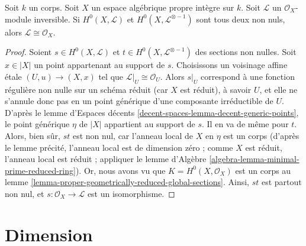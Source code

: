 \begin{lemma}
\label{lemma-characterize-trivial-pic-integral}
Soit $k$ un corps. Soit $X$ un espace algébrique propre intègre sur $k$.
Soit $\mathcal{L}$ un $\mathcal{O}_X$-module inversible.
Si $H^0(X, \mathcal{L})$ et $H^0(X, \mathcal{L}^{\otimes - 1})$
sont tous deux non nuls, alors $\mathcal{L} \cong \mathcal{O}_X$.
\end{lemma}

\begin{proof}
Soient $s \in H^0(X, \mathcal{L})$ et $t \in H^0(X, \mathcal{L}^{\otimes - 1})$
des sections non nulles. Soit $x \in |X|$ un point appartenant au support de $s$.
Choisissons un voisinage affine \'etale $(U, u) \to (X, x)$ tel que
$\mathcal{L}|_U \cong \mathcal{O}_U$. Alors $s|_U$ correspond à une fonction régulière non nulle
sur un schéma réduit (car $X$ est réduit), à savoir $U$, et elle ne
s'annule donc pas en un point générique d'une composante irréductible de $U$. D'après le
lemme d'Espaces décents \ref{decent-spaces-lemma-decent-generic-points},
le point générique $\eta$ de $|X|$ appartient au support de $s$.
Il en va de même pour $t$. Alors, bien sûr, $st$ est non nul, car
l'anneau local de $X$ en $\eta$ est un corps (d'après le lemme précité,
l'anneau local est de dimension zéro ; comme $X$ est réduit, l'anneau local est
réduit ; appliquer le lemme d'Algèbre \ref{algebra-lemma-minimal-prime-reduced-ring}).
Or, nous avons vu que $K = H^0(X, \mathcal{O}_X)$
est un corps au lemme \ref{lemma-proper-geometrically-reduced-global-sections}.
Ainsi, $st$ est partout non nul, et
$s : \mathcal{O}_X \to \mathcal{L}$ est un isomorphisme.
\end{proof}






\section{Dimension}
\label{section-dimension}

